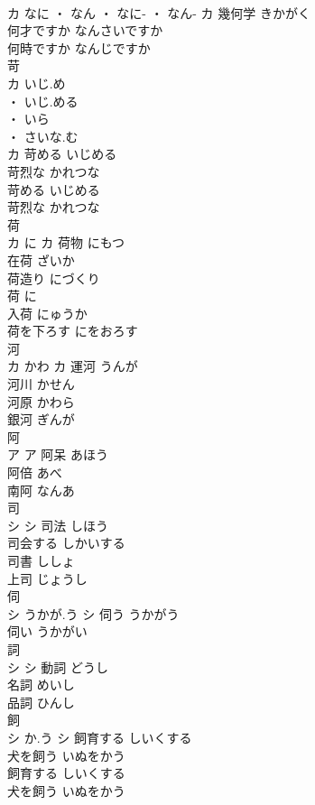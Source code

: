 \documentclass[8pt]{extreport}
\begin{document}
\begin{CJK}{UTF8}{min}
\\	カ	なに ・ なん ・ なに- ・ なん-	カ	幾何学	きかがく	
\\	何才ですか	なんさいですか	
\\	何時ですか	なんじですか	
\\	苛	
\\	カ	いじ.め
\\	・ いじ.める
\\	・ いら
\\	・ さいな.む
\\	カ	苛める	いじめる	
\\	苛烈な	かれつな	
\\	苛める	いじめる	
\\	苛烈な	かれつな	
\\	荷	
\\	カ	に	カ	荷物	にもつ	
\\	在荷	ざいか	
\\	荷造り	にづくり	
\\	荷	に	
\\	入荷	にゅうか	
\\	荷を下ろす	にをおろす	
\\	河	
\\	カ	かわ	カ	運河	うんが	
\\	河川	かせん	
\\	河原	かわら	
\\	銀河	ぎんが	
\\	阿	
\\	ア		ア													阿呆	あほう	
\\	阿倍	あべ	
\\	南阿	なんあ	
\\	司	
\\	シ		シ	司法	しほう	
\\	司会する	しかいする	
\\	司書	ししょ	
\\	上司	じょうし	
\\	伺	
\\	シ	うかが.う	シ	伺う	うかがう	
\\	伺い	うかがい	
\\	詞	
\\	シ		シ	動詞	どうし	
\\	名詞	めいし	
\\	品詞	ひんし	
\\	飼	
\\	シ	か.う	シ	飼育する	しいくする	
\\	犬を飼う	いぬをかう	
\\	飼育する	しいくする	
\\	犬を飼う	いぬをかう	

\end{CJK}
\end{document}
